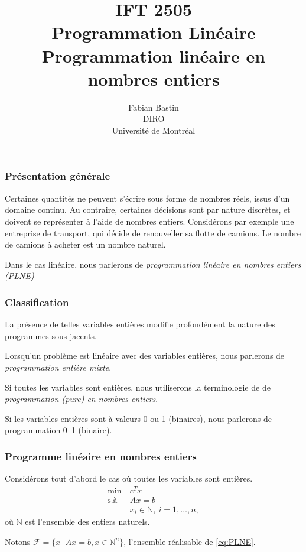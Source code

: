 \documentclass[usepdftitle=false]{beamer}
\title[IFT2505 -- PLNE]{IFT 2505\\Programmation Linéaire\\Programmation linéaire en nombres entiers}
\author[Fabian Bastin]{Fabian Bastin\\DIRO\\Université de Montréal\\\mbox{}}
\date{}
\def\cF{\mathcal{F}}
\begin{document}
\frame{\titlepage}

\begin{frame}
\frametitle{Présentation générale}

Certaines quantités ne peuvent s'écrire sous forme de nombres réels, issus d'un domaine continu. Au contraire, certaines décisions sont par nature discrètes, et doivent se représenter à l'aide de nombres entiers.
Considérons par exemple une entreprise de transport, qui décide de renouveller sa flotte de camions.
Le nombre de camions à acheter est un nombre naturel.

\mbox{}

Dans le cas linéaire, nous parlerons de {\em programmation linéaire en nombres entiers (PLNE)}



\end{frame}

\begin{frame}
\frametitle{Classification}

La présence de telles variables entières modifie profondément la nature des programmes sous-jacents.

\mbox{}

Lorsqu'un problème est linéaire avec des variables entières, nous parlerons de {\sl programmation entière mixte}.

\mbox{}

Si toutes les variables sont entières, nous utiliserons la terminologie de de {\sl programmation (pure) en nombres entiers}.

\mbox{}

Si les variables entières sont à valeurs 0 ou 1 (binaires), nous parlerons de programmation 0--1 (binaire).

\end{frame}

\begin{frame}
\frametitle{Programme linéaire en nombres entiers}

Considérons tout d'abord le cas où toutes les variables sont entières.
\begin{equation}
\begin{aligned}
\min\ & c^Tx \\
\mbox{s.à } & Ax = b \\
& x_i \in \mathbb{N},\ i = 1,\ldots,n,
\end{aligned}
\tag{P}
\label{eq:PLNE}
\end{equation}
où $\mathbb{N}$ est l'ensemble des entiers naturels.

\mbox{}

Notons $\cF = \{ x \,|\, Ax = b, x \in \mathbb{N}^n \}$,
l'ensemble réalisable de \eqref{eq:PLNE}.

\end{frame}
\end{document}
